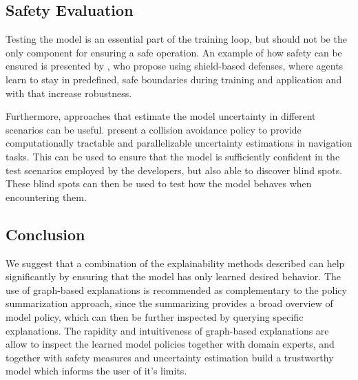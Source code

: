 \documentclass[twoside,11pt]{article}
\begin{document}
\subsection{Safety Evaluation}
Testing the model is an essential part of the training loop, but should not be the only component for ensuring a safe operation. An example of how safety can be ensured is presented by \citet{XiongEtAl:2020:Robustness}, who propose using shield-based defenses, where agents learn to stay in predefined, safe boundaries during training and application and with that increase robustness.

Furthermore, approaches that estimate the model uncertainty in different scenarios can be useful. \citet{LuetjensEverettHow:2018:RLModelUncertainty} present a collision avoidance policy to provide computationally tractable and parallelizable uncertainty estimations in navigation tasks. This can be used to ensure that the model is sufficiently confident in the test scenarios employed by the developers, but also able to discover blind spots. These blind spots can then be used to test how the model behaves when encountering them.

\subsection{Conclusion}

We suggest that a combination of the explainability methods described can help significantly by ensuring that the model has only learned desired behavior. The use of graph-based explanations is recommended as complementary to the policy summarization approach, since the summarizing provides a broad overview of model policy, which can then be further inspected by querying specific explanations. The rapidity and intuitiveness of graph-based explanations are allow to inspect the learned model policies together with domain experts, and together with safety measures and uncertainty estimation build a trustworthy model which informs the user of it's limits.
\end{document}
